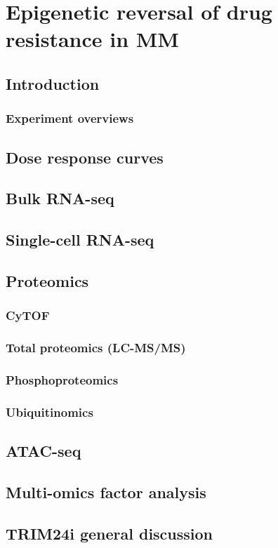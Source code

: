 \chapter{\label{ch:8-TRIM24i}Epigenetic reversal of drug resistance in MM}


\section{Introduction}

\subsection{Experiment overviews}



\section{Dose response curves}

\section{Bulk RNA-seq}

\section{Single-cell RNA-seq}

\section{Proteomics}

\subsection{CyTOF}

\subsection{Total proteomics (LC-MS/MS)}

\subsection{Phosphoproteomics}

\subsection{Ubiquitinomics}

\section{ATAC-seq}

\section{Multi-omics factor analysis}

\section{TRIM24i general discussion}
